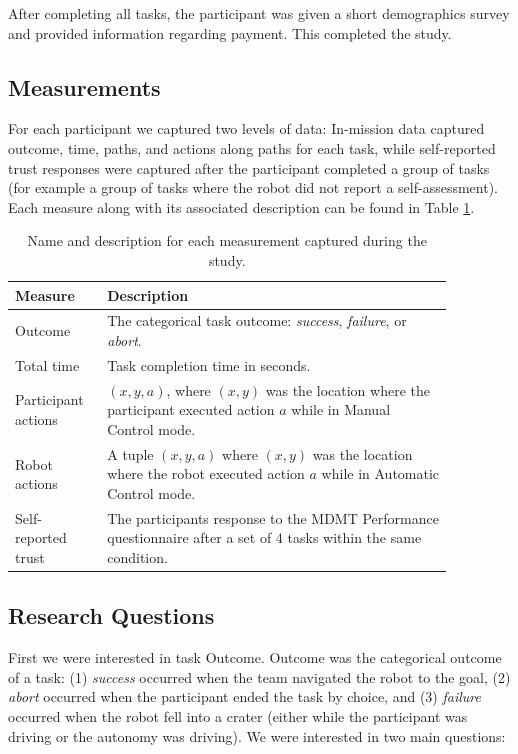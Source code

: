 \documentclass[aaai]{article}
\begin{document}
After completing all tasks, the participant was given a short demographics survey and provided information regarding payment. This completed the study.

\subsection{Measurements}
For each participant we captured two levels of data: In-mission data captured outcome, time, paths, and actions along paths for each task, while self-reported trust responses were captured after the participant completed a group of tasks (for example a group of tasks where the robot did not report a self-assessment). Each measure along with its associated description can be found in Table \ref{measures_table}.

\begin{table}[h]
    \begin{center}
    \begin{tabular}{|p{0.17\linewidth}||p{0.70\linewidth}|}
    \hline
    \textbf{Measure} & \textbf{Description} \\
    \hline
    \hline
    Outcome & The categorical task outcome: \emph{success}, \emph{failure}, or \emph{abort}.\\
    \hline
    Total time & Task completion time in seconds.\\
    \hline
    Participant actions &  $(x,y,a)$, where $(x, y)$ was the location where the participant executed action $a$ while in Manual Control mode.\\
    \hline
    Robot actions & A tuple $(x,y, a)$ where $(x, y)$ was the location where the robot executed action $a$ while in Automatic Control mode.\\
    \hline
    Self-reported trust &  The participants response to the MDMT Performance questionnaire after a set of $4$ tasks within the same condition.\\
    \hline
    \end{tabular}
    \end{center}
    \caption{Name and description for each measurement captured during the study.}
    \label{measures_table}
\end{table}

\subsection{Research Questions} 
First we were interested in task Outcome. Outcome was the categorical outcome of a task: (1) \emph{success} occurred when the team navigated the robot to the goal, (2) \emph{abort} occurred when the participant ended the task by choice, and (3) \emph{failure} occurred when the robot fell into a crater (either while the participant was driving or the autonomy was driving). We were interested in two main questions:
\end{document}
